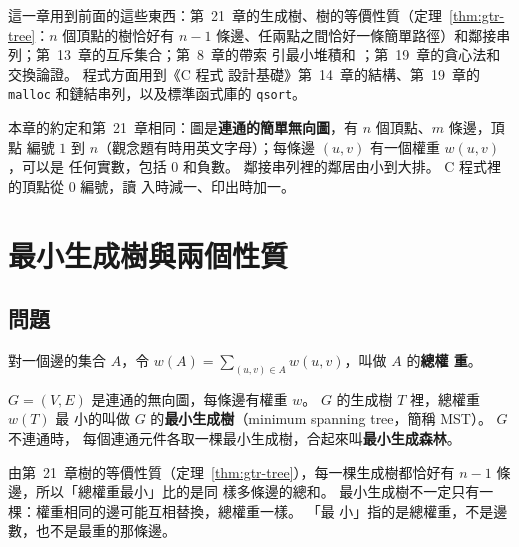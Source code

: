 這一章用到前面的這些東西：第~21~章的生成樹、樹的等價性質（定理~\ref{thm:gtr-tree}：$n$ 個頂點的樹恰好有
$n - 1$ 條邊、任兩點之間恰好一條簡單路徑）和鄰接串列；第~13~章的互斥集合；第~8~章的帶索
引最小堆積和 ；第~19~章的貪心法和交換論證。 程式方面用到《C 程式
設計基礎》第~14~章的結構、第~19~章的 \texttt{malloc} 和鏈結串列，以及標準函式庫的
\texttt{qsort}。

本章的約定和第~21~章相同：圖是\textbf{連通的簡單無向圖}，有 $n$ 個頂點、$m$ 條邊，頂點
編號 $1$ 到 $n$（觀念題有時用英文字母）；每條邊 $(u, v)$ 有一個權重 $w(u, v)$，可以是
任何實數，包括 $0$ 和負數。 鄰接串列裡的鄰居由小到大排。 C 程式裡的頂點從 $0$ 編號，讀
入時減一、印出時加一。

\section{最小生成樹與兩個性質}
\label{sec:mst-props}

\subsection{問題}

對一個邊的集合 $A$，令 $w(A) = \sum_{(u, v) \in A} w(u, v)$，叫做 $A$ 的\textbf{總權
重}。

\begin{definition}
$G = (V, E)$ 是連通的無向圖，每條邊有權重 $w$。 $G$ 的生成樹 $T$ 裡，總權重 $w(T)$ 最
小的叫做 $G$ 的\textbf{最小生成樹}（minimum spanning tree，簡稱 MST）。 $G$ 不連通時，
每個連通元件各取一棵最小生成樹，合起來叫\textbf{最小生成森林}。
\end{definition}

由第~21~章樹的等價性質（定理~\ref{thm:gtr-tree}），每一棵生成樹都恰好有 $n - 1$ 條邊，所以「總權重最小」比的是同
樣多條邊的總和。 最小生成樹不一定只有一棵：權重相同的邊可能互相替換，總權重一樣。 「最
小」指的是總權重，不是邊數，也不是最重的那條邊。

\begin{center}
\label{fig:mst-camp}
\end{center}


